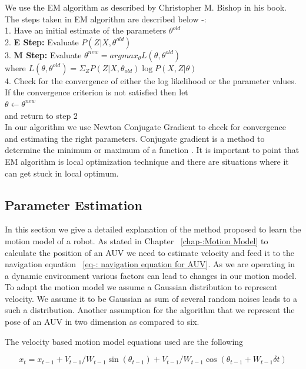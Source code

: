 \documentclass[12pt]{dalcsthesis}
\begin{document}
We use the EM algorithm as described by Christopher M. Bishop\cite{bishop2006pattern} in his book. The steps taken in EM algorithm are described below -:
\\
1. Have an initial estimate of the parameters $\theta ^{old}$
\\
2. \textbf{E Step:} Evaluate $P(Z|X,\theta^{old})$
\\
3. \textbf{M Step:} Evaluate $\theta ^{new} = arg max _{\theta} L(\theta,\theta^{old})$
\\
\hspace*{20 mm} where 
$L(\theta,\theta^{old})=\Sigma _{Z} P(Z|X,\theta_{old}) \log P(X,Z|\theta)$
\\
4. Check for the convergence of either the log likelihood or the parameter values. If the convergence criterion is not satisfied then let
\\
\hspace*{20 mm} $\theta \leftarrow \theta^{new} $
\\
and return to step 2
\\
In our algorithm we use Newton Conjugate Gradient to check for convergence and estimating	 the right parameters. Conjugate gradient is a method to determine the minimum or maximum of a function \cite{shewchuk1994introduction}. It is important to point that EM algorithm is local optimization technique and there are situations where it can get stuck in local optimum. 		


\subsection{Parameter Estimation}
\label{ch:adapting the motion model}
In this section we give a detailed explanation of the method proposed to learn the motion model of a robot. As stated in Chapter ~\ref{chap-:Motion Model} to calculate the position of an AUV we need to estimate velocity and feed it to the navigation equation ~\ref{eq-: navigation equation for AUV}. As we are operating in a dynamic environment various factors can lead to changes in our motion model. To adapt the motion model we assume a Gaussian distribution to represent velocity. We assume it to be Gaussian as sum of several random noises leads to a such a distribution. Another assumption for the algorithm that we represent the pose of an AUV in two dimension as compared to six. 

The velocity based motion model equations used are the following

\begin{equation}
 x_{t}=x_{t-1}+V_{t-1}/W_{t-1} \sin(\theta_{t-1})+ V_{t-1}/W_{t-1} \cos(\theta_{t-1} + W_{t-1} \delta t)
\end{equation}
\end{document}
